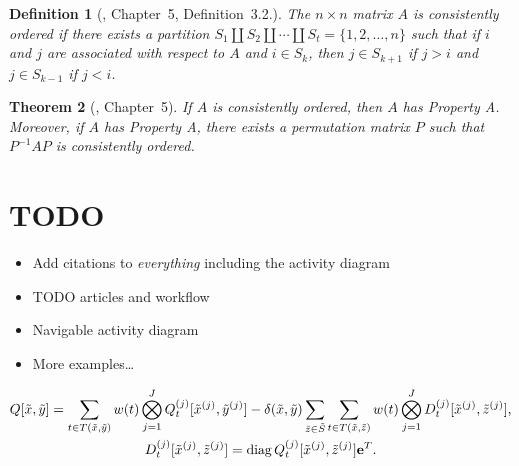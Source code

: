 \documentclass[a4paper,10pt,twoside,openright]{memoir}
\renewcommand*{\vec}[1]{\boldsymbol{\mathrm{#1}}}
\newcommand*{\macroS}{}\let\macroS\tilde
\DeclareMathOperator{\diag}{diag}
\newtheorem{thm}{Theorem}[chapter]
\newtheorem{dfn}[thm]{Definition}
\begin{document}
\begin{dfn}[\citet{young1971iterative}, Chapter~5, Definition~3.2.]
  The $n \times n$ matrix $A$ is \emph{consistently ordered} if there
  exists a partition
  $S_1 \coprod S_2 \coprod \cdots \coprod S_t = \{1, 2, \ldots, n\}$
  such that if $i$ and $j$ are associated with respect to $A$ and
  $i \in S_k$, then $j \in S_{k + 1}$ if $j > i$ and $j \in S_{k - 1}$
  if $j < i$.
\end{dfn}

\begin{thm}[\citet{young1971iterative}, Chapter~5]
  If $A$ is consistently ordered, then $A$ has Property A. Moreover,
  if $A$ has Property A, there exists a permutation matrix $P$ such
  that $P^{-1} A P$ is consistently ordered.
\end{thm}

\section{TODO}

\begin{itemize}
\item Add citations to \emph{everything} including the activity
  diagram
\item TODO articles and workflow
\item Navigable activity diagram
\item More examples\ldots
\end{itemize}

\begin{gather}
  Q[\macroS{x}, \macroS{y}] = \sum_{t \in T(\macroS{x}, \macroS{y})}
  w(t) \bigotimes_{j = 1}^J Q_{t}^{(j)}[\macroS{x}^{(j)},
  \macroS{y}^{(j)}]
  - \delta(\macroS{x}, \macroS{y}) \sum_{\macroS{z} \in \macroS{S}} \sum_{t \in T(\macroS{x}, \macroS{z})}
  w(t) \bigotimes_{j = 1}^J D_{t}^{(j)}[\macroS{x}^{(j)},
  \macroS{z}^{(j)}] \text, \\
  D_{t}^{(j)}[\macroS{x}^{(j)}, \macroS{z}^{(j)}] = \diag
  Q_{t}^{(j)}[\macroS{x}^{(j)}, \macroS{z}^{(j)}] \vec{e}^T \text.
\end{gather}

\backmatter

\printbibliography
\end{document}
